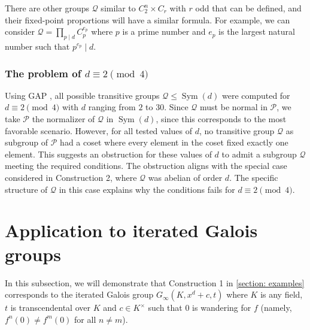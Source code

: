 \documentclass{amsart}
\DeclareMathOperator{\Sym}{Sym}
\begin{document}
There are other groups $\mathcal{Q}$ similar to $C_2^n \times C_r$ with $r$ odd that can be defined, and their fixed-point proportions will have a similar formula. For example, we can consider $\mathcal{Q} = \prod_{p \mid d } C_p^{e_p}$ where $p$ is a prime number and $e_p$ is the largest natural number such that $p^{e_p} \mid d$. 

\subsubsection{The problem of $d \equiv 2 \pmod{4}$}

Using GAP \cite{GAP}, all possible transitive groups $\mathcal{Q} \leq \Sym(d)$ were computed for $d \equiv 2 \pmod{4}$ with $d$ ranging from $2$ to $30$. Since $\mathcal{Q}$ must be normal in $\mathcal{P}$, we take $\mathcal{P}$ the normalizer of $\mathcal{Q}$ in $\Sym(d)$, since this corresponds to the most favorable scenario. However, for all tested values of $d$, no transitive group $\mathcal{Q}$ as subgroup of $\mathcal{P}$ had a coset where every element in the coset fixed exactly one element. This suggests an obstruction for these values of $d$ to admit a subgroup $\mathcal{Q}$ meeting the required conditions. The obstruction aligns with the special case considered in Construction 2, where $\mathcal{Q}$ was abelian of order $d$. The specific structure of $\mathcal{Q}$ in this case explains why the conditions fails for $d \equiv 2 \pmod{4}$.

\section{Application to iterated Galois groups}
\label{section: Application to iterated Galois groups}

In this subsection, we will demonstrate that Construction 1 in \cref{section: examples} corresponds to the iterated Galois group $G_\infty(K,x^d+c,t)$ where $K$ is any field, $t$ is transcendental over $K$ and $c \in K^\times$ such that $0$ is wandering for $f$ (namely, $f^n(0) \neq f^m(0)$ for all $n \neq m$).
\end{document}
